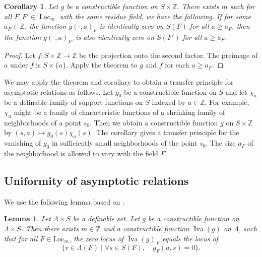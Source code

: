 \documentclass[12pt]{amsart}
\newcommand{\op}[1]{\operatorname{#1}}
\newcommand{\ring}[1]{{\mathbb #1}}
\newcommand{\locus}[1]{\op{Iva}(#1)}
\newcommand{\Loc}{\mathrm{Loc}}
\theoremstyle{plain}
\newtheorem{lem}[thm]{Lemma}
\newtheorem{cor}[thm]{Corollary}
\theoremstyle{definition}
\begin{document}
\begin{cor}\label{cor:12} Let $g$ be a constructible function on $S\times\ring{Z}$.
  There exists $m$ such for all $F,F'\in\op{Loc}_m$ with the same
  residue field, we have the following.  If for some $a_F\in\ring{Z}$, the
  function $g(\cdot,a)_F$ is identically zero on $S(F)$ for all $a\ge
  a_F$, then the function $g(\cdot,a)_{F'}$ is also identically zero
  on $S(F')$ for all $a\ge a_F$.
\end{cor}

\begin{proof} Let $f:S\times \ring{Z}\to\ring{Z}$ be the projection
  onto the second factor.  The preimage of $a$ under $f$ is
  $S\times\{a\}$.  Apply the theorem to $g$ and $f$ for each $a\ge
  a_F$.
\end{proof}

We may apply the theorem and corollary to obtain a transfer principle
for asymptotic relations as follows.  Let $g_0$ be a constructible
function on $S$ and let $\chi_a$ be a definable family of support
functions on $S$ indexed by $a\in\ring{Z}$.  For example, $\chi_a$ might
be a family of characteristic functions of a shrinking family of
neighborhoods of a point $s_0$.  Then we obtain a constructible
function $g$ on $S\times\ring{Z}$ by $(s,a)\mapsto g_0(s)\chi_a(s)$.
The corollary gives a transfer principle for the vanishing of $g_0$ in
sufficiently small neighborhoods of the point $s_0$.  The size $a_F$ of the
neighborhood is allowed to vary with the field $F$.

\subsection{Uniformity of asymptotic relations}

We use the following lemma based on \cite[Th 4.4.4]{CGH}.

\begin{lem}  
  Let $\Lambda\times S$ be a definable set.  Let $g$ be a
  constructible function on $\Lambda\times S$.  Then there exists
  $m\in\ring{Z}$ and a constructible function $\locus{g}$ on $\Lambda$,
  such that for all $F\in\Loc_m$, the zero locus of $\locus{g}_{\,F}$
  equals the locus of
\[
\{v\in \Lambda(F)\mid \forall s\in S(F),\quad g_F(a,s)=0\}.
\]
\end{lem}
\end{document}
